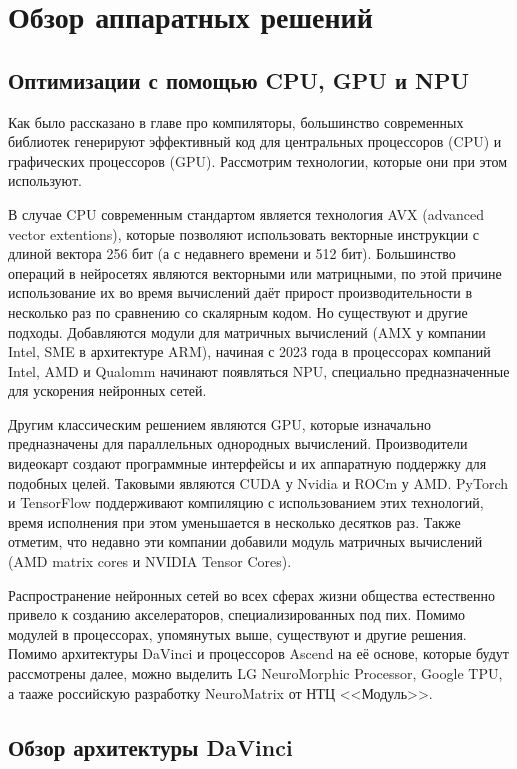 \section{Обзор аппаратных решений}
\label{sec:Chapter6} 

\subsection{Оптимизации с помощью CPU, GPU и NPU}

Как было рассказано в главе про компиляторы, большинство современных библиотек
генерируют эффективный код для центральных процессоров (CPU) и графических
процессоров (GPU). Рассмотрим технологии, которые они при этом используют.

В случае CPU современным стандартом является технология AVX (advanced vector
extentions), которые позволяют использовать векторные инструкции с длиной
вектора 256 бит (а с недавнего времени и 512 бит). Большинство операций в
нейросетях являются векторными или матрицными, по этой причине использование
их во время вычислений даёт прирост производительности в несколько раз по
сравнению со скалярным кодом. Но существуют и другие подходы. Добавляются
модули для матричных вычислений (AMX у компании Intel, SME в архитектуре ARM),
начиная с 2023 года в процессорах компаний Intel, AMD и Qualomm начинают
появляться NPU, специально предназначенные для ускорения нейронных сетей.

Другим классическим решением являются GPU, которые изначально предназначены
для параллельных однородных вычислений. Производители видеокарт создают
программные интерфейсы и их аппаратную поддержку для подобных целей. Таковыми
являются CUDA у Nvidia и ROCm у AMD. PyTorch и TensorFlow поддерживают
компиляцию с использованием этих технологий, время исполнения при этом
уменьшается в несколько десятков раз. Также отметим, что недавно эти компании
добавили модуль матричных вычислений (AMD matrix cores и NVIDIA Tensor Cores).

Распространение нейронных сетей во всех сферах жизни общества естественно
привело к созданию акселераторов, специализированных под пих. Помимо модулей
в процессорах, упомянутых выше, существуют и другие решения. Помимо архитектуры
DaVinci и процессоров Ascend на её основе, которые будут рассмотрены далее,
можно выделить LG NeuroMorphic Processor, Google TPU, а тааже российскую
разработку NeuroMatrix от НТЦ <<Модуль>>.

\subsection{Обзор архитектуры DaVinci}
